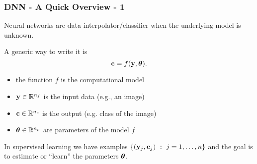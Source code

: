 \documentclass[12pt,fleqn]{beamer}
\begin{document}
\begin{frame}\frametitle{DNN - A Quick Overview - 1}

Neural networks are data interpolator/classifier when the underlying model
is unknown.

\bigskip

A generic way to write it is
$$ {\bf c} = f({\bf y},{\boldsymbol \theta}). $$


\begin{itemize}
\item the function $f$ is the computational model
\item ${\bf y}\in\mathbb{R}^{n_f}$ is the input data (e.g., an image)
\item ${\bf c}\in\mathbb{R}^{n_c}$ is the output (e.g. class of the image)
\item ${\boldsymbol \theta}\in\mathbb{R}^{n_p}$ are parameters of the model $f$
\end{itemize}

In supervised learning we have examples $\{({\bf y}_j,{\bf c}_j) \ : \ j=1,\ldots,n\}$ and the goal
is to estimate or ``learn'' the parameters ${\boldsymbol \theta}$.

\end{frame}
\end{document}
